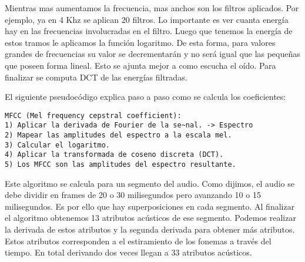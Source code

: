 Mientras mas aumentamos la frecuencia, mas anchos son los filtros aplicados. Por ejemplo, ya en 4 Khz se aplican 20 filtros. Lo importante es ver cuanta energía hay en las frecuencias involucradas en el filtro. Luego que tenemos la energía de estos tramos le aplicamos la función logaritmo. De esta forma, para valores grandes de frecuencias su valor se decrementarán y no será igual que las pequeñas que poseen forma lineal. Esto se ajunta mejor a como escucha el oído. Para finalizar se computa DCT de las energías filtradas. 

El siguiente pseudocódigo explica paso a paso como se calcula los coeficientes:
\begin{lstlisting}
MFCC (Mel frequency cepstral coefficient):
1) Aplicar la derivada de Fourier de la se~nal. -> Espectro
2) Mapear las amplitudes del espectro a la escala mel.
3) Calcular el logaritmo.
4) Aplicar la transformada de coseno discreta (DCT).
5) Los MFCC son las amplitudes del espectro resultante.
\end{lstlisting}

Este algoritmo se calcula para un segmento del audio. Como dijimos, el audio se debe dividir en frames de 20 o 30 milisegundos pero avanzando 10 o 15 milisegundos. Es por ello que hay superposiciones en cada segmento. Al finalizar el algoritmo obtenemos 13 atributos acústicos de ese segmento. Podemos realizar la derivada de estos atributos y la segunda derivada para obtener más atributos. Estos atributos corresponden a el estiramiento de los fonemas a través del tiempo. En total derivando dos veces llegan a 33 atributos acústicos.

